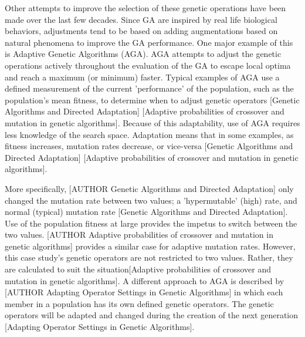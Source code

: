 \documentclass{sig-alternate}
\begin{document}
Other attempts to improve the selection of these genetic operations have been made over the last few decades. Since GA are inspired by real life biological behaviors, adjustments tend to be based on adding augmentations based on natural phenomena to improve the GA performance. One major example of this is Adaptive Genetic Algorithms (AGA). AGA attempts to adjust the genetic operations actively throughout the evaluation of the GA to escape local optima and reach a maximum (or minimum) faster. Typical examples of AGA use a defined measurement of the current 'performance' of the population, such as the population's mean fitness, to determine when to adjust genetic operators [Genetic Algorithms and Directed Adaptation] [Adaptive probabilities of crossover and mutation in genetic algorithms]. Because of this adaptability, use of AGA requires less knowledge of the search space. Adaptation means that in some examples, as fitness increases, mutation rates decrease, or vice-versa [Genetic Algorithms and Directed Adaptation] [Adaptive probabilities of crossover and mutation in genetic algorithms]. 

More specifically, [AUTHOR Genetic Algorithms and Directed Adaptation] only changed the mutation rate between two values; a 'hypermutable' (high) rate, and normal (typical) mutation rate [Genetic Algorithms and Directed Adaptation]. Use of the population fitness at large provides the impetus to switch between the two values. [AUTHOR Adaptive probabilities of crossover and mutation in genetic algorithms] provides a similar case for adaptive mutation rates. However, this case study's genetic operators are not restricted to two values. Rather, they are calculated to suit the situation[Adaptive probabilities of crossover and mutation in genetic algorithms]. A different approach to AGA is described by [AUTHOR Adapting Operator Settings in Genetic Algorithms] in which each member in a population has its own defined genetic operators. The genetic operators will be adapted and changed during the creation of the next generation [Adapting Operator Settings in Genetic Algorithms].
\end{document}
